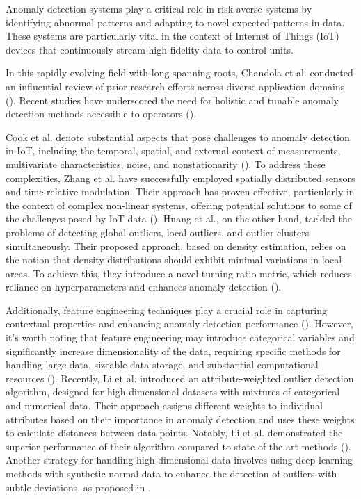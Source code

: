 Anomaly detection systems play a critical role in risk-averse systems by identifying abnormal patterns and adapting to novel expected patterns in data. These systems are particularly vital in the context of Internet of Things (IoT) devices that continuously stream high-fidelity data to control units.

In this rapidly evolving field with long-spanning roots, Chandola et al. conducted an influential review of prior research efforts across diverse application domains (\cite{Chandola2009}).
Recent studies have underscored the need for holistic and tunable anomaly detection methods accessible to operators (\cite{Laptev2015, Kejariwal2015, Cook2020}).

Cook et al. denote substantial aspects that pose challenges to anomaly detection in IoT, including the temporal, spatial, and external context of measurements, multivariate characteristics, noise, and nonstationarity (\cite{Cook2020}). To address these complexities, Zhang et al. have successfully employed spatially distributed sensors and time-relative modulation. Their approach has proven effective, particularly in the context of complex non-linear systems, offering potential solutions to some of the challenges posed by IoT data (\cite{ZHANG2024121506}). Huang et al., on the other hand, tackled the problems of detecting global outliers, local outliers, and outlier clusters simultaneously. Their proposed approach, based on density estimation, relies on the notion that density distributions should exhibit minimal variations in local areas. To achieve this, they introduce a novel turning ratio metric, which reduces reliance on hyperparameters and enhances anomaly detection (\cite{HUANG2023120799}).

Additionally, feature engineering techniques play a crucial role in capturing contextual properties and enhancing anomaly detection performance (\cite{Fan2019}). However, it's worth noting that feature engineering may introduce categorical variables and significantly increase dimensionality of the data, requiring specific methods for handling large data, sizeable data storage, and substantial computational resources (\cite{Talagala2021}). Recently, Li et al. introduced an attribute-weighted outlier detection algorithm, designed for high-dimensional datasets with mixtures of categorical and numerical data. Their approach assigns different weights to individual attributes based on their importance in anomaly detection and uses these weights to calculate distances between data points. Notably, Li et al. demonstrated the superior performance of their algorithm compared to state-of-the-art methods (\cite{LI2024121304}). Another strategy for handling high-dimensional data involves using deep learning methods with synthetic normal data to enhance the detection of outliers with subtle deviations, as proposed in \cite{DU2024121161}.

